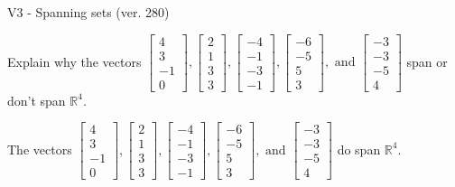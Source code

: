 \begin{exercise}
  \begin{exerciseTitle}V3 - Spanning sets (ver. 280)\end{exerciseTitle}
  \begin{exerciseStatement}
    Explain why the vectors \(\left[\begin{array}{r}
4 \\
3 \\
-1 \\
0
\end{array}\right] , \left[\begin{array}{r}
2 \\
1 \\
3 \\
3
\end{array}\right] , \left[\begin{array}{r}
-4 \\
-1 \\
-3 \\
-1
\end{array}\right] , \left[\begin{array}{r}
-6 \\
-5 \\
5 \\
3
\end{array}\right] , \text{ and } \left[\begin{array}{r}
-3 \\
-3 \\
-5 \\
4
\end{array}\right]\) span or don't span \(\mathbb{R}^4\). 
	


  \end{exerciseStatement}
  \begin{exerciseAnswer}
   The vectors \(\left[\begin{array}{r}
4 \\
3 \\
-1 \\
0
\end{array}\right] , \left[\begin{array}{r}
2 \\
1 \\
3 \\
3
\end{array}\right] , \left[\begin{array}{r}
-4 \\
-1 \\
-3 \\
-1
\end{array}\right] , \left[\begin{array}{r}
-6 \\
-5 \\
5 \\
3
\end{array}\right] , \text{ and } \left[\begin{array}{r}
-3 \\
-3 \\
-5 \\
4
\end{array}\right]\) 
  	 do  
	span \(\mathbb{R}^4\).
  



\end{exerciseAnswer}
\end{exercise}
